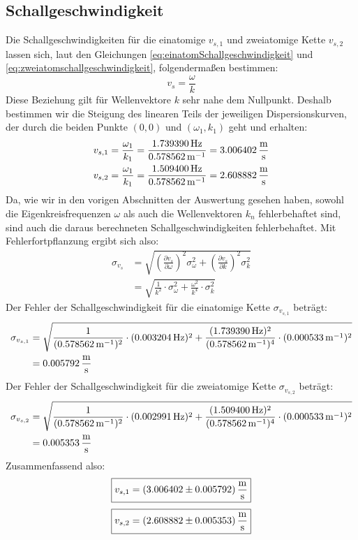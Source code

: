 \documentclass[a4paper,titlepage]{scrartcl}
\numberwithin{equation}{section}
\begin{document}
\subsection{Schallgeschwindigkeit}
Die Schallgeschwindigkeiten für die einatomige $v_{s,1}$ und zweiatomige Kette $v_{s,2}$ lassen sich, laut den Gleichungen \ref{eq:einatomSchallgeschwindigkeit} und \ref{eq:zweiatomschallgeschwindigkeit}, folgendermaßen bestimmen:
\begin{equation*}
v_s=\frac{\omega}{k}
\end{equation*}
Diese Beziehung gilt für Wellenvektore $k$ sehr nahe dem Nullpunkt. Deshalb bestimmen wir die Steigung des linearen Teils der jeweiligen Dispersionskurven, der durch die beiden Punkte $(0,0)$ und $(\omega_1,k_1)$ geht und erhalten:
\begin{align*}
v_{s,1}&=\frac{\omega_1}{k_1}=\frac{\unit[1.739390]{Hz}}{\unit[0.578562]{m^{-1}}}=\unit[3.006402]{\frac{m}{s}}\\
v_{s,2}&=\frac{\omega_1}{k_1}=\frac{\unit[1.509400]{Hz}}{\unit[0.578562]{m^{-1}}}=\unit[2.608882]{\frac{m}{s}}
\end{align*}
Da, wie wir in den vorigen Abschnitten der Auswertung gesehen haben, sowohl die Eigenkreisfrequenzen $\omega$ als auch die Wellenvektoren $k_n$ fehlerbehaftet sind, sind auch die daraus berechneten Schallgeschwindigkeiten fehlerbehaftet. Mit Fehlerfortpflanzung ergibt sich also:
\begin{align*}
\sigma_{v_s}&=\sqrt{\left( \frac{\partial v_s}{\partial \omega} \right)^2 \sigma_{\omega}^2 + \left( \frac{\partial v_s}{\partial k} \right)^2 \sigma_k^2}\\
&=\sqrt{\frac{1}{k^2} \cdot \sigma_{\omega}^2 + \frac{\omega^2}{k^4} \cdot \sigma_k^2}
\end{align*}
Der Fehler der Schallgeschwindigkeit für die einatomige Kette $\sigma_{v_{s,1}}$ beträgt:
\begin{align*}
\sigma_{v_{s,1}}&=\sqrt{\frac{1}{(\unit[0.578562]{m^{-1}})^2} \cdot (\unit[0.003204]{Hz})^2 + \frac{(\unit[1.739390]{Hz})^2}{(\unit[0.578562]{m^{-1}})^4} \cdot (\unit[0.000533]{m^{-1}})^2}\\
&=\unit[0.005792]{\frac{m}{s}}
\end{align*}
Der Fehler der Schallgeschwindigkeit für die zweiatomige Kette $\sigma_{v_{s,2}}$ beträgt:
\begin{align*}
\sigma_{v_{s,2}}&=\sqrt{\frac{1}{(\unit[0.578562]{m^{-1}})^2} \cdot (\unit[0.002991]{Hz})^2 + \frac{(\unit[1.509400]{Hz})^2}{(\unit[0.578562]{m^{-1}})^4} \cdot (\unit[0.000533]{m^{-1}})^2}\\
&=\unit[0.005353]{\frac{m}{s}}
\end{align*}
Zusammenfassend also:
\begin{equation*}
\boxed{v_{s,1}=\unit[(3.006402 \pm 0.005792)]{\frac{m}{s}}}
\end{equation*}
\begin{equation*}
\boxed{v_{s,2}=\unit[(2.608882 \pm 0.005353)]{\frac{m}{s}}}
\end{equation*}
\end{document}
